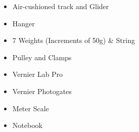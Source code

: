 \begin{itemize}
    \item {Air-cushioned track and Glider}
    \item {Hanger}
    \item {7 Weights (Increments of 50g) \& String}
    \item {Pulley and Clamps}
    \item {Vernier Lab Pro}
    \item {Vernier Photogates}
    \item {Meter Scale}
    \item {Notebook}
    \label{mat}
\end{itemize}


